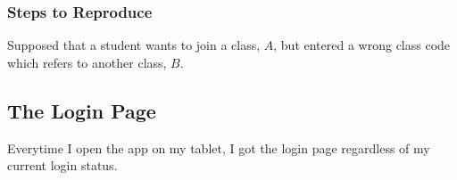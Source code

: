 \documentclass{article}
\begin{document}
\subsubsection*{Steps to Reproduce}
Supposed that a student wants to join a class, $A$, but entered a wrong class code which refers to another class, $B$.
\begin{center}
\end{center}

\subsection{The Login Page}
Everytime I open the app on my tablet, I got the login page regardless of my current login status.
\end{document}
